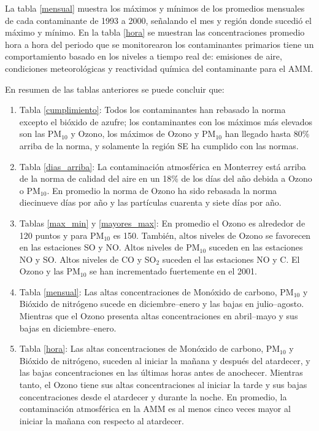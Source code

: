 La tabla \ref{mensual} muestra los máximos y mínimos de los promedios mensuales de cada contaminante de 1993 a 2000, señalando el mes y región donde sucedió el máximo y mínimo. En la tabla \ref{hora}  se muestran las concentraciones promedio hora a hora del periodo que se monitorearon los contaminantes primarios tiene un comportamiento basado en los niveles a tiempo real de: emisiones de aire, condiciones meteorológicas y reactividad química del contaminante para el AMM.

En resumen de las tablas anteriores se puede concluir que:
\setlength{\parskip}{-1cm}
\begin{enumerate}
\item Tabla \ref{cumplimiento}: Todos los contaminantes han rebasado la norma excepto el bióxido de azufre; los contaminantes con los máximos más elevados son las PM$_{10}$ y Ozono, los máximos de Ozono y PM$_{10}$ han llegado hasta 80\% arriba de la norma, y solamente la región SE ha cumplido con las normas.
\item Tabla \ref{dias_arriba}: La contaminación atmosférica en Monterrey está arriba de la norma de calidad del aire en un 18\% de los días del año debida a Ozono o PM$_{10}$. En promedio la norma de Ozono ha sido rebasada la norma diecinueve días por año y las partículas cuarenta y siete días por año.
\item Tablas \ref{max_min} y \ref{mayores_max}: En promedio el Ozono es alrededor de 120 puntos y para PM$_{10}$ es 150. También, altos niveles de Ozono se favorecen en las estaciones SO y NO. Altos niveles de PM$_{10}$ suceden en las estaciones NO y SO. Altos niveles de CO y SO$_{2}$ suceden el las estaciones NO y C. El Ozono y las PM$_{10}$ se han incrementado fuertemente en el 2001.
\item Tabla \ref{mensual}: Las altas concentraciones de Monóxido de carbono, PM$_{10}$ y Bióxido de nitrógeno sucede en diciembre--enero y las bajas en julio--agosto. Mientras que el Ozono presenta altas concentraciones en abril--mayo y sus bajas en diciembre--enero.
\item Tabla \ref{hora}: Las altas concentraciones de Monóxido de carbono, PM$_{10}$ y Bióxido de nitrógeno, suceden al iniciar la mañana y después del atardecer, y las bajas concentraciones en las últimas horas antes de anochecer. Mientras tanto, el Ozono tiene sus altas concentraciones al iniciar la tarde y sus bajas concentraciones desde el atardecer y durante la noche. En promedio, la contaminación atmosférica en la AMM es al menos cinco veces mayor al iniciar la mañana con respecto al atardecer.
\end{enumerate}
\setlength{\parskip}{6mm}

